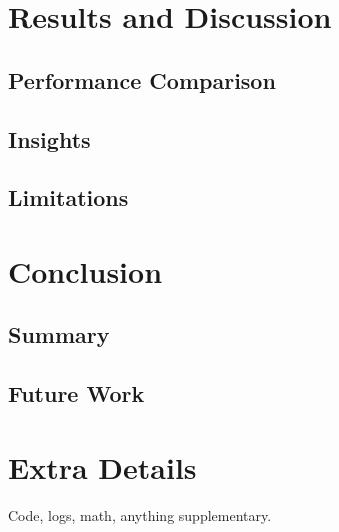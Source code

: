 \documentclass[14pt,a4paper]{report}
\begin{document}
\chapter{Results and Discussion}
\section{Performance Comparison}
\section{Insights}
\section{Limitations}

\chapter{Conclusion}
\section{Summary}
\section{Future Work}




\appendix
\chapter{Extra Details}
Code, logs, math, anything supplementary.
\end{document}
